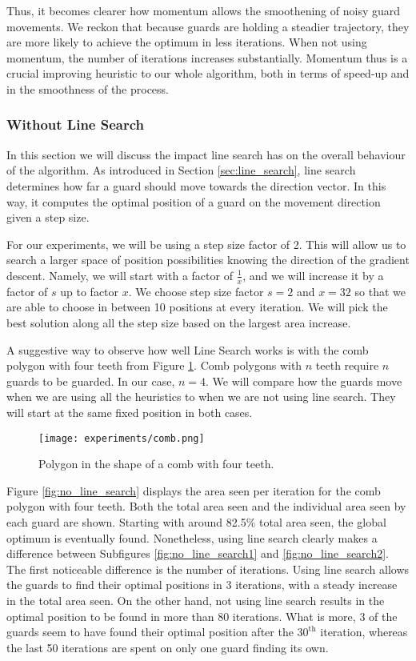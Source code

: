 Thus, it becomes clearer how momentum allows the smoothening of noisy guard movements. We reckon that because guards are holding a steadier trajectory, they are more likely to achieve the optimum in less iterations. When not using momentum, the number of iterations increases substantially. Momentum thus is a crucial improving heuristic to our whole algorithm, both in terms of speed-up and in the smoothness of the process.

\subsubsection{Without Line Search}
In this section we will discuss the impact line search has on the overall behaviour of the algorithm. As introduced in Section \ref{sec:line_search}, line search determines how far a guard should move towards the direction vector. In this way, it computes the optimal position of a guard on the movement direction given a step size.

For our experiments, we will be using a step size factor of 2. This will allow us to search a larger space of position possibilities knowing the direction of the gradient descent. 
Namely, we will start with a factor of $\frac 1 x$, and we will increase it by a factor of $s$ up to factor $x$. We choose step size factor $s = 2$ and $x = 32$ so that we are able to choose in between 10 positions at every iteration. We will pick the best solution along all the step size based on the largest area increase. 

A suggestive way to observe how well Line Search works is with the comb polygon with four teeth from Figure \ref{fig:comb}. Comb polygons with $n$ teeth require $n$ guards to be guarded. In our case, $n = 4$. We will compare how the guards move when we are using all the heuristics to when we are not using line search. They will start at the same fixed position in both cases.

\begin{figure}[h!]
    \centering
    \texttt{[image: experiments/comb.png]}
    \caption{Polygon in the shape of a comb with four teeth.}
    \label{fig:comb}
\end{figure}

Figure \ref{fig:no_line_search} displays the area seen per iteration for the comb polygon with four teeth. Both the total area seen and the individual area seen by each guard are shown. Starting with around 82.5\% total area seen, the global optimum is eventually found. Nonetheless, using line search clearly makes a difference between Subfigures \ref{fig:no_line_search1} and \ref{fig:no_line_search2}. The first noticeable difference is the number of iterations. Using line search allows the guards to find their optimal positions in 3 iterations, with a steady increase in the total area seen. On the other hand, not using line search results in the optimal position to be found in more than 80 iterations. What is more, 3 of the guards seem to have found their optimal position after the $30^{\text{th}}$ iteration, whereas the last 50 iterations are spent on only one guard finding its own.


